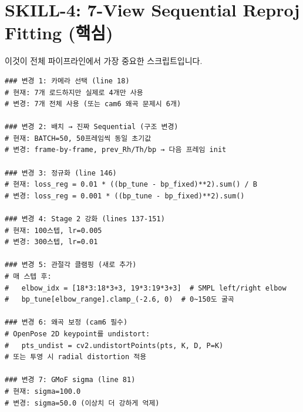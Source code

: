 \documentclass[11pt, a4paper]{report}
\begin{document}
\section{SKILL-4: 7-View Sequential Reproj Fitting (핵심)}

이것이 전체 파이프라인에서 가장 중요한 스크립트입니다.

\begin{codebox}[title={주요 변경사항 vs 현재 uhmr\_7cam\_reproj.py}]
\begin{verbatim}
### 변경 1: 카메라 선택 (line 18)
# 현재: 7개 로드하지만 실제로 4개만 사용
# 변경: 7개 전체 사용 (또는 cam6 왜곡 문제시 6개)

### 변경 2: 배치 → 진짜 Sequential (구조 변경)
# 현재: BATCH=50, 50프레임씩 동일 초기값
# 변경: frame-by-frame, prev_Rh/Th/bp → 다음 프레임 init

### 변경 3: 정규화 (line 146)
# 현재: loss_reg = 0.01 * ((bp_tune - bp_fixed)**2).sum() / B
# 변경: loss_reg = 0.001 * ((bp_tune - bp_fixed)**2).sum()

### 변경 4: Stage 2 강화 (lines 137-151)
# 현재: 100스텝, lr=0.005
# 변경: 300스텝, lr=0.01

### 변경 5: 관절각 클램핑 (새로 추가)
# 매 스텝 후:
#   elbow_idx = [18*3:18*3+3, 19*3:19*3+3]  # SMPL left/right elbow
#   bp_tune[elbow_range].clamp_(-2.6, 0)  # 0~150도 굴곡

### 변경 6: 왜곡 보정 (cam6 필수)
# OpenPose 2D keypoint를 undistort:
#   pts_undist = cv2.undistortPoints(pts, K, D, P=K)
# 또는 투영 시 radial distortion 적용

### 변경 7: GMoF sigma (line 81)
# 현재: sigma=100.0
# 변경: sigma=50.0 (이상치 더 강하게 억제)
\end{verbatim}
\end{codebox}
\end{document}
